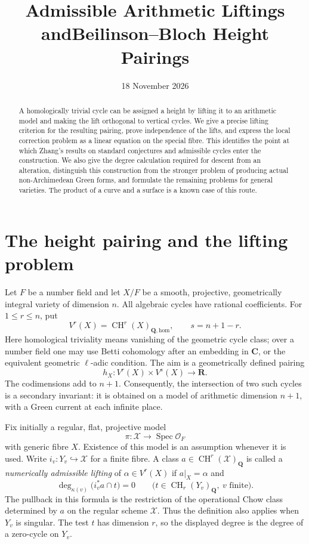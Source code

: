 \documentclass[11pt,a4paper]{article}
\title{Admissible Arithmetic Liftings and\newline Beilinson--Bloch Height Pairings}
\author{}
\date{18 November 2026}
\theoremstyle{definition}
\numberwithin{equation}{section}
\newcommand{\CH}{\operatorname{CH}}
\newcommand{\Q}{\mathbf Q}
\newcommand{\R}{\mathbf R}
\newcommand{\C}{\mathbf C}
\newcommand{\Spec}{\operatorname{Spec}}
\newcommand{\homol}{\mathrm{hom}}
\begin{document}
\maketitle
\begin{abstract}
A homologically trivial cycle can be assigned a height by lifting it to an arithmetic model and making the lift orthogonal to vertical cycles. We give a precise lifting criterion for the resulting pairing, prove independence of the lifts, and express the local correction problem as a linear equation on the special fibre. This identifies the point at which Zhang's results on standard conjectures and admissible cycles enter the construction. We also give the degree calculation required for descent from an alteration, distinguish this construction from the stronger problem of producing actual non-Archimedean Green forms, and formulate the remaining problems for general varieties. The product of a curve and a surface is a known case of this route.
\end{abstract}

\tableofcontents

\section{The height pairing and the lifting problem}\label{sec:zhang-introduction}

Let $F$ be a number field and let $X/F$ be a smooth, projective, geometrically integral variety of dimension $n$. All algebraic cycles have rational coefficients. For $1\leq r\leq n$, put
\[
 V^r(X)=\CH^r(X)_{\Q,\homol},\qquad s=n+1-r.
\]
Here homological triviality means vanishing of the geometric cycle class; over a number field one may use Betti cohomology after an embedding in $\C$, or the equivalent geometric $\ell$-adic condition. The aim is a geometrically defined pairing
\begin{equation}\label{eq:zhang-target}
 h_X:V^r(X)\times V^s(X)\longrightarrow\R.
\end{equation}
The codimensions add to $n+1$. Consequently, the intersection of two such cycles is a secondary invariant: it is obtained on a model of arithmetic dimension $n+1$, with a Green current at each infinite place.

Fix initially a regular, flat, projective model
\[
 \pi:\mathcal X\longrightarrow\Spec\mathcal O_F
\]
with generic fibre $X$. Existence of this model is an assumption whenever it is used. Write $i_v:Y_v\hookrightarrow\mathcal X$ for a finite fibre. A class $a\in\CH^r(\mathcal X)_\Q$ is called a \emph{numerically admissible lifting} of $\alpha\in V^r(X)$ if $a|_X=\alpha$ and
\begin{equation}\label{eq:zhang-vertical-orthogonality}
 \deg_{\kappa(v)}\bigl(i_v^*a\cap t\bigr)=0
 \qquad\bigl(t\in\CH_r(Y_v)_\Q,\ v\text{ finite}\bigr).
\end{equation}
The pullback in this formula is the restriction of the operational Chow class determined by $a$ on the regular scheme $\mathcal X$. Thus the definition also applies when $Y_v$ is singular. The test $t$ has dimension $r$, so the displayed degree is the degree of a zero-cycle on $Y_v$.
\end{document}
